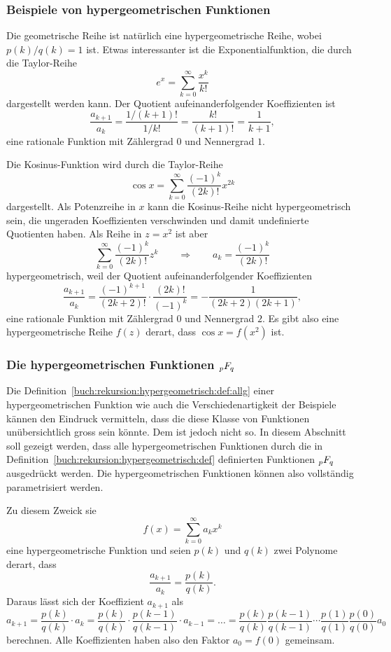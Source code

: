 %
%
\subsubsection{Beispiele von hypergeometrischen Funktionen}
Die geometrische Reihe ist natürlich eine hypergeometrische Reihe,
wobei $p(k)/q(k)=1$ ist.
Etwas interessanter ist die Exponentialfunktion, die durch die Taylor-Reihe
\[
e^x = \sum_{k=0}^\infty \frac{x^k}{k!}
\]
dargestellt werden kann.
Der Quotient aufeinanderfolgender Koeffizienten ist
\[
\frac{a_{k+1}}{a_k}
=
\frac{1/(k+1)!}{1/k!}
=
\frac{k!}{(k+1)!}
=
\frac{1}{k+1},
\]
eine rationale Funktion mit Zählergrad $0$ und Nennergrad $1$.

Die Kosinus-Funktion wird durch die Taylor-Reihe
\[
\cos x = \sum_{k=0}^\infty \frac{(-1)^k}{(2k)!} x^{2k}
\]
dargestellt.
Als Potenzreihe in $x$ kann die Kosinus-Reihe nicht hypergeometrisch sein,
die ungeraden Koeffizienten verschwinden und damit undefinierte
Quotienten haben.
Als Reihe in $z=x^2$ ist aber
\[
\sum_{k=0}^\infty \frac{(-1)^k}{(2k)!} z^k
\qquad\Rightarrow\qquad
a_k = \frac{(-1)^k}{(2k)!}
\]
hypergeometrisch, weil der Quotient aufeinanderfolgender Koeffizienten
\[
\frac{a_{k+1}}{a_k}
=
\frac{(-1)^{k+1}}{(2k+2)!}\cdot \frac{(2k)!}{(-1)^k}
=
-\frac{1}{(2k+2)(2k+1)},
\]
eine rationale Funktion mit Zählergrad $0$ und Nennergrad $2$.
Es gibt also eine hypergeometrische Reihe $f(z)$ derart, dass
$\cos x = f(x^2)$ ist.

%
%
\subsubsection{Die hypergeometrischen Funktionen $\mathstrut_pF_q$}
Die Definition~\ref{buch:rekursion:hypergeometrisch:def:allg}
einer hypergeometrischen Funktion wie auch die Verschiedenartigkeit
der Beispiele kännen den Eindruck vermitteln, dass die diese Klasse
von Funktionen unübersichtlich gross sein könnte.
Dem ist jedoch nicht so.
In diesem Abschnitt soll gezeigt werden, dass alle hypergeometrischen
Funktionen durch die in
Definition~\ref{buch:rekursion:hypergeometrisch:def} definierten
Funktionen $\mathstrut_pF_q$ ausgedrückt werden.
Die hypergeometrischen Funktionen können also vollständig parametrisiert
werden.

Zu diesem Zweick sie
\[
f(x)
=
\sum_{k=0}^\infty a_kx^k
\]
eine hypergeometrische Funktion und
seien $p(k)$ und $q(k)$ zwei Polynome derart, dass
\[
\frac{a_{k+1}}{a_k} = \frac{p(k)}{q(k)}.
\]
Daraus lässt sich der Koeffizient $a_{k+1}$ als
\begin{equation}
a_{k+1}
=
\frac{p(k)}{q(k)}
\cdot
a_k
=
\frac{p(k)}{q(k)}
\cdot
\frac{p(k-1)}{q(k-1)}
\cdot
a_{k-1}
=\dots=
\frac{p(k)}{q(k)}
\frac{p(k-1)}{q(k-1)}
\cdots
\frac{p(1)}{q(1)}
\frac{p(0)}{q(0)}
a_0
\label{buch:rekursion:hypergeometrisch:ak+1}
\end{equation}
berechnen.
Alle Koeffizienten haben also den Faktor $a_0=f(0)$ gemeinsam.

